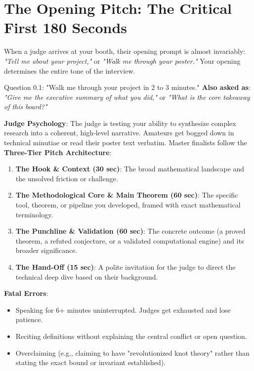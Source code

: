 \documentclass[11pt,letterpaper]{article}
\begin{document}
\newpage
\section{The Opening Pitch: The Critical First 180 Seconds}

When a judge arrives at your booth, their opening prompt is almost invariably: \textit{"Tell me about your project,"} or \textit{"Walk me through your poster."} Your opening determines the entire tone of the interview.

\begin{questionbox}{Question 0.1: "Walk me through your project in 2 to 3 minutes."}
\textbf{Also asked as}: \textit{"Give me the executive summary of what you did,"} or \textit{"What is the core takeaway of this board?"}
\end{questionbox}

\begin{strategybox}
\textbf{Judge Psychology}: The judge is testing your ability to synthesize complex research into a coherent, high-level narrative. Amateurs get bogged down in technical minutiae or read their poster text verbatim. Master finalists follow the \textbf{Three-Tier Pitch Architecture}:
\begin{enumerate}
    \item \textbf{The Hook \& Context (30 sec)}: The broad mathematical landscape and the unsolved friction or challenge.
    \item \textbf{The Methodological Core \& Main Theorem (60 sec)}: The specific tool, theorem, or pipeline you developed, framed with exact mathematical terminology.
    \item \textbf{The Punchline \& Validation (60 sec)}: The concrete outcome (a proved theorem, a refuted conjecture, or a validated computational engine) and its broader significance.
    \item \textbf{The Hand-Off (15 sec)}: A polite invitation for the judge to direct the technical deep dive based on their background.
\end{enumerate}
\end{strategybox}

\begin{trapbox}
\textbf{Fatal Errors}:
\begin{itemize}
    \item Speaking for 6+ minutes uninterrupted. Judges get exhausted and lose patience.
    \item Reciting definitions without explaining the central conflict or open question.
    \item Overclaiming (e.g., claiming to have "revolutionized knot theory" rather than stating the exact bound or invariant established).
\end{itemize}
\end{trapbox}
\end{document}
